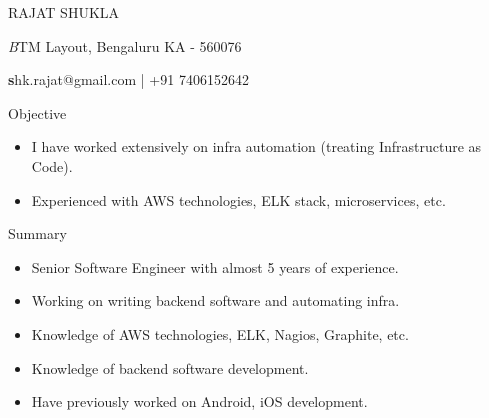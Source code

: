 \documentclass[a4paper,11pt,oneside]{article}
\makeatletter
\newcommand{\name}{RAJAT SHUKLA}
\newcommand{\addr}{BTM Layout, Bengaluru KA - 560076}
\newcommand{\contact}{shk.rajat@gmail.com | +91 7406152642}
\newcommand{\bigname}[1]{
  \begin{center}\fontfamily{phv}\selectfont\LARGE#1\end{center}
}
\newcommand{\bignamenew}[1]{
  \begin{center}\selectfont\Huge#1\end{center}
}
\newcommand{\addrinfo}[1]{
  \begin{center}\selectfont\small\textit#1\end{center}
}
\newcommand{\contactinfo}[1]{
  \begin{center}\selectfont\small\textbf#1\end{center}
}
\newenvironment{ressection}[1]{
  \vspace{4pt}
         {\fontfamily{phv}\selectfont\Large#1}
         \begin{itemize}
           \vspace{3pt}
}{
         \end{itemize}
}
\newcommand{\resitem}[1]{
  \vspace{-4pt}
\item \begin{flushleft} #1 \end{flushleft}
}
\newcommand{\ressubitem}[1]{
  \vspace{-1pt}
\item \begin{flushleft} #1 \end{flushleft}
}
\newcommand{\resbigitem}[3]{
  \vspace{-5pt}
\item
  \textbf{#1} --- #2 \\
  \textit{#3}
}
\newenvironment{ressubsec}[3]{
  \resbigitem{#1}{#2}{#3}
  \vspace{-2pt}
  \begin{itemize}
}{
  \end{itemize}
}
\makeatother
\begin{document}

\bigname{\name}

\vspace{2 pt}
\addrinfo{\addr}

\contactinfo{\contact}
\vspace{8 pt}


\begin{ressection}{Objective}
  \resitem{
    I have worked extensively on infra automation (treating
    Infrastructure as Code).
  }
  \resitem{
    Experienced with AWS technologies, ELK stack, microservices, etc.
  }
\end{ressection}


\begin{ressection}{Summary}
  \resitem{
    Senior Software Engineer with almost 5 years of experience.
  }
  \resitem{
    Working on writing backend software and automating infra.
  }
  \resitem{
    Knowledge of AWS technologies, ELK, Nagios, Graphite, etc.
  }
  \resitem{
    Knowledge of backend software development.
  }
  \resitem{
    Have previously worked on Android, iOS development.
  }
\end{ressection}




\end{document}
